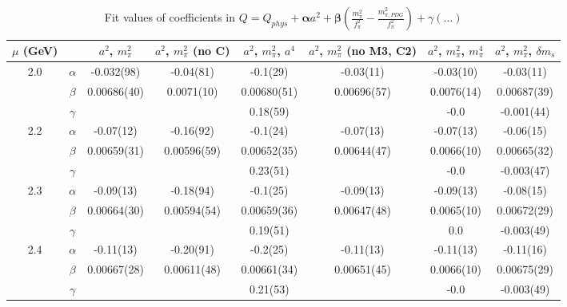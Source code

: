 \documentclass[12pt]{extarticle}
\begin{document}
\begin{table}[h!]
\begin{center}
\begin{tabular}{|c c|c|c|c|c|c|c|}
\hline
$\mu$ (GeV) &  & $a^2$, $m_\pi^2$& $a^2$, $m_\pi^2$ (no C)& $a^2$, $m_\pi^2$, $a^4$& $a^2$, $m_\pi^2$ (no M3, C2)& $a^2$, $m_\pi^2$, $m_\pi^4$& $a^2$, $m_\pi^2$, $\delta m_s$\\
\hline
\multirow{3}{0.5in}{2.0} & $\alpha$ & -0.032(98)& -0.04(81)& -0.1(29)& -0.03(11)& -0.03(10)& -0.03(11)\\
 & $\beta$ & 0.00686(40)& 0.0071(10)& 0.00680(51)& 0.00696(57)& 0.0076(14)& 0.00687(39)\\
 & $\gamma$ &  &  & 0.18(59)&  & -0.0& -0.001(44)\\
\hline
\multirow{3}{0.5in}{2.2} & $\alpha$ & -0.07(12)& -0.16(92)& -0.1(24)& -0.07(13)& -0.07(13)& -0.06(15)\\
 & $\beta$ & 0.00659(31)& 0.00596(59)& 0.00652(35)& 0.00644(47)& 0.0066(10)& 0.00665(32)\\
 & $\gamma$ &  &  & 0.23(51)&  & -0.0& -0.003(47)\\
\hline
\multirow{3}{0.5in}{2.3} & $\alpha$ & -0.09(13)& -0.18(94)& -0.1(25)& -0.09(13)& -0.09(13)& -0.08(15)\\
 & $\beta$ & 0.00664(30)& 0.00594(54)& 0.00659(36)& 0.00647(48)& 0.0065(10)& 0.00672(29)\\
 & $\gamma$ &  &  & 0.19(51)&  & 0.0& -0.003(49)\\
\hline
\multirow{3}{0.5in}{2.4} & $\alpha$ & -0.11(13)& -0.20(91)& -0.2(25)& -0.11(13)& -0.11(13)& -0.11(16)\\
 & $\beta$ & 0.00667(28)& 0.00611(48)& 0.00661(34)& 0.00651(45)& 0.0066(10)& 0.00675(29)\\
 & $\gamma$ &  &  & 0.21(53)&  & -0.0& -0.003(49)\\
\hline
\end{tabular}
\caption{Fit values of coefficients in $Q = Q_{phys} + \mathbf{\alpha} a^2 + \mathbf{\beta}\left(\frac{m_\pi^2}{f_\pi^2}-\frac{m_{\pi,PDG}^2}{f_\pi^2}\right) + \gamma(\ldots)$}
\end{center}
\end{table}








\end{document}
